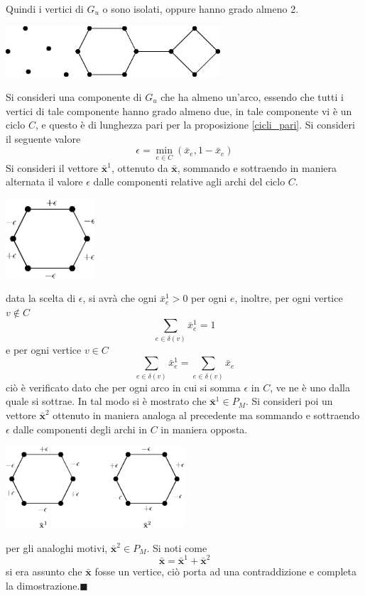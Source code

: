 \documentclass[10pt, letterpaper]{report}
\newcommand{\x}{{\mathbf{x}}}
\begin{document}
\noindent
Quindi i vertici di $G_u$ o sono isolati, oppure hanno grado almeno 2.\begin{center}
    \includegraphics[width=0.6\textwidth ]{images/grafo_deg_no_1.eps}
\end{center}
Si consideri una componente di $G_u$ che ha almeno un'arco, essendo che tutti i vertici di tale componente hanno grado almeno due, in tale componente vi è un ciclo $C$, e questo è di lunghezza pari per la proposizione \ref{cicli_pari}. Si consideri il seguente valore 
$$\epsilon = \min_{e\in C}(\bar x_e,1-\bar x_e) $$
Si consideri il vettore $\bar\x^1$, ottenuto da $\bar\x$, sommando e sottraendo in maniera alternata il valore $\epsilon$ dalle componenti relative agli archi del ciclo $C$.\begin{center}
    \includegraphics[width=0.25\textwidth ]{images/pm_epsilon.eps}
\end{center}
data la scelta di $\epsilon$, si avrà che ogni $\bar x_e^1>0$ per ogni $e$, inoltre, per ogni vertice $v\notin C$
$$ \sum_{e\in\delta(v)}\bar x_e^1=1$$
e per ogni vertice $v\in C$
$$ \sum_{e\in\delta(v)}\bar x_e^1= \sum_{e\in\delta(v)}\bar x_e$$
ciò è verificato dato che per ogni arco in cui si somma $\epsilon$ in $C$, ve ne è uno dalla quale si sottrae. In tal modo si è mostrato che $\bar \x^1\in P_M$. Si consideri poi un vettore $\bar \x^2$ ottenuto in maniera analoga al precedente ma sommando e sottraendo $\epsilon$ dalle componenti degli archi in $C$ in maniera opposta.\begin{center}
    \includegraphics[width=0.5\textwidth ]{images/pm_epsilon2.eps}
\end{center}
per gli analoghi motivi, $\bar \x^2\in P_M$. Si noti come 
$$\bar \x = \bar \x^1+\bar \x^2 $$
si era assunto che $\bar \x$ fosse un vertice, ciò porta ad una contraddizione e completa la dimostrazione.\hfill$\blacksquare$\bigskip 
\end{document}
